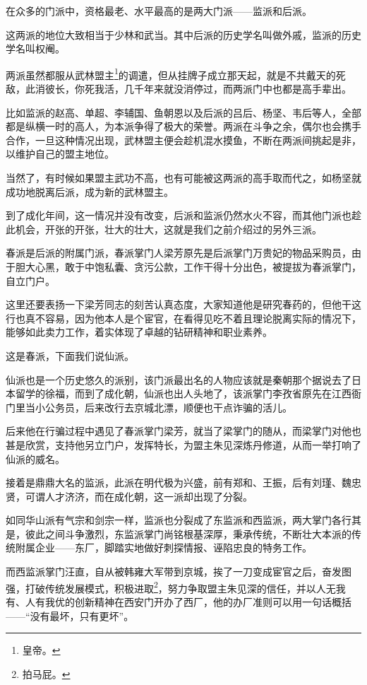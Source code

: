 \begin{multicols}{\theparacolNo}
在众多的门派中，资格最老、水平最高的是两大门派——监派和后派。

这两派的地位大致相当于少林和武当。其中后派的历史学名叫做外戚，监派的历史学名叫权阉。

两派虽然都服从武林盟主\footnote{皇帝。}的调遣，但从挂牌子成立那天起，就是不共戴天的死敌，此消彼长，你死我活，几千年来就没消停过，而两派门中也都是高手辈出。

比如监派的赵高、单超、李辅国、鱼朝恩以及后派的吕后、杨坚、韦后等人，全部都是纵横一时的高人，为本派争得了极大的荣誉。两派在斗争之余，偶尔也会携手合作，一旦这种情况出现，武林盟主便会趁机混水摸鱼，不断在两派间挑起是非，以维护自己的盟主地位。

当然了，有时候如果盟主武功不高，也有可能被这两派的高手取而代之，如杨坚就成功地脱离后派，成为新的武林盟主。

到了成化年间，这一情况并没有改变，后派和监派仍然水火不容，而其他门派也趁此机会，开张的开张，壮大的壮大，这就是我们之前介绍过的另外三派。

春派是后派的附属门派，春派掌门人梁芳原先是后派掌门万贵妃的物品采购员，由于胆大心黑，敢于中饱私囊、贪污公款，工作干得十分出色，被提拔为春派掌门，自立门户。

这里还要表扬一下梁芳同志的刻苦认真态度，大家知道他是研究春药的，但他干这行也真不容易，因为他本人是个宦官，在看得见吃不着且理论脱离实际的情况下，能够如此卖力工作，着实体现了卓越的钻研精神和职业素养。

这是春派，下面我们说仙派。

仙派也是一个历史悠久的派别，该门派最出名的人物应该就是秦朝那个据说去了日本留学的徐福，而到了成化朝，仙派也出人头地了，该派掌门李孜省原先在江西衙门里当小公务员，后来改行去京城北漂，顺便也干点诈骗的活儿。

后来他在行骗过程中遇见了春派掌门梁芳，就当了梁掌门的随从，而梁掌门对他也甚是欣赏，支持他另立门户，发挥特长，为盟主朱见深炼丹修道，从而一举打响了仙派的威名。

接着是鼎鼎大名的监派，此派在明代极为兴盛，前有郑和、王振，后有刘瑾、魏忠贤，可谓人才济济，而在成化朝，这一派却出现了分裂。

如同华山派有气宗和剑宗一样，监派也分裂成了东监派和西监派，两大掌门各行其是，彼此之间斗争激烈，东监派掌门尚铭根基深厚，秉承传统，不断壮大本派的传统附属企业——东厂，脚踏实地做好刺探情报、诬陷忠良的特务工作。

而西监派掌门汪直，自从被韩雍大军带到京城，挨了一刀变成宦官之后，奋发图强，打破传统发展模式，积极进取\footnote{拍马屁。}，努力争取盟主朱见深的信任，并以人无我有、人有我优的创新精神在西安门开办了西厂，他的办厂准则可以用一句话概括——“没有最坏，只有更坏”。


\end{multicols}
